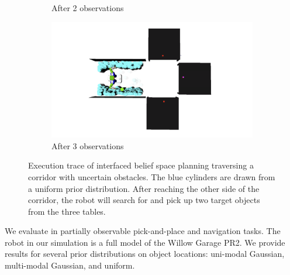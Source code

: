 \begin{figure}
\begin{subfigure}[b]{0.22\linewidth}
    \caption{After 2 observations}
  \end{subfigure}
  \begin{subfigure}[b]{0.22\linewidth}
    \includegraphics[width=\textwidth]{corridor_images/3-observe.png}
    \caption{After 3 observations}
  \end{subfigure}
  \caption{Execution trace of interfaced belief space planning
    traversing a corridor with uncertain obstacles.  The blue
    cylinders are drawn from a uniform prior distribution. After
    reaching the other side of the corridor, the robot will search for
    and pick up two target objects from the three tables.}
  \label{fig:corridorimgs}
\end{figure}

We evaluate \ibsp{} in partially observable pick-and-place and navigation
tasks.  The robot in our simulation is a full model of the Willow
Garage PR2. We provide results for several prior distributions on
object locations: uni-modal Gaussian, multi-modal Gaussian, and uniform.

